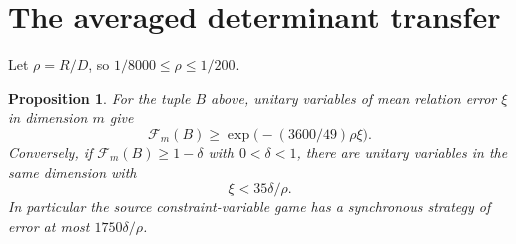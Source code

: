 \documentclass[11pt,a4paper]{article}
\newtheorem{proposition}[theorem]{Proposition}
\newcommand{\F}{\mathcal F}
\begin{document}
\section{The averaged determinant transfer}
Let $\rho=R/D$, so $1/8000\le\rho\le1/200$.
\begin{proposition}\label{prop:transfer}
For the tuple $B$ above, unitary variables of mean relation error $\xi$ in dimension $m$ give
\begin{equation}
 \F_m(B)\ge\exp\bigl(-(3600/49)\rho\xi\bigr).            \label{eq:forward}
\end{equation}
Conversely, if $\F_m(B)\ge1-\delta$ with $0<\delta<1$, there are unitary variables in the same dimension with
\begin{equation}
 \xi<35\delta/\rho.                                    \label{eq:reverse}
\end{equation}
In particular the source constraint-variable game has a synchronous strategy of error at most $1750\delta/\rho$.
\end{proposition}
\end{document}
